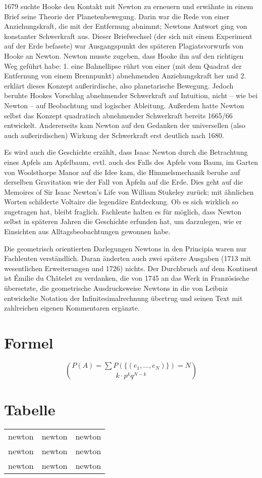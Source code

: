 1679 suchte Hooke den Kontakt mit Newton zu erneuern und erwähnte in einem Brief seine Theorie der Planetenbewegung. Darin war die Rede von einer Anziehungskraft, die mit der Entfernung abnimmt; Newtons Antwort ging von konstanter Schwerkraft aus. Dieser Briefwechsel (der sich mit einem Experiment auf der Erde befasste) war Ausgangspunkt des späteren Plagiatsvorwurfs von Hooke an Newton. Newton musste zugeben, dass Hooke ihn auf den richtigen Weg geführt habe: 1. eine Bahnellipse rührt von einer (mit dem Quadrat der Entfernung von einem Brennpunkt) abnehmenden Anziehungskraft her und 2. erklärt dieses Konzept außerirdische, also planetarische Bewegung. Jedoch beruhte Hookes Vorschlag abnehmender Schwerkraft auf Intuition, nicht – wie bei Newton – auf Beobachtung und logischer Ableitung. Außerdem hatte Newton selbst das Konzept quadratisch abnehmender Schwerkraft bereits 1665/66 entwickelt. Andererseits kam Newton auf den Gedanken der universellen (also auch außerirdischen) Wirkung der Schwerkraft erst deutlich nach 1680.

Es wird auch die Geschichte erzählt, dass Isaac Newton durch die Betrachtung eines Apfels am Apfelbaum, evtl. auch des Falls des Apfels vom Baum, im Garten von Woolsthorpe Manor auf die Idee kam, die Himmelsmechanik beruhe auf derselben Gravitation wie der Fall von Äpfeln auf die Erde. Dies geht auf die Memoires of Sir Isaac Newton’s Life von William Stukeley zurück; mit ähnlichen Worten schilderte Voltaire die legendäre Entdeckung. Ob es sich wirklich so zugetragen hat, bleibt fraglich. Fachleute halten es für möglich, dass Newton selbst in späteren Jahren die Geschichte erfunden hat, um darzulegen, wie er Einsichten aus Alltagsbeobachtungen gewonnen habe.

Die geometrisch orientierten Darlegungen Newtons in den Principia waren nur Fachleuten verständlich. Daran änderten auch zwei spätere Ausgaben (1713 mit wesentlichen Erweiterungen und 1726) nichts. Der Durchbruch auf dem Kontinent ist Émilie du Châtelet zu verdanken, die von 1745 an das Werk in Französische übersetzte, die geometrische Ausdrucksweise Newtons in die von Leibniz entwickelte Notation der Infinitesimalrechnung übertrug und seinen Text mit zahlreichen eigenen Kommentaren ergänzte.





\section{Formel}
$$ P(A) = \sum P(\{ (e_1,...,e_N) \})  =  {N}\choose{k} \cdot p^kq^{N-k}$$




\section{Tabelle}
\begin{center}
\begin{tabular}{ |c|c|c| } 
 \hline
 newton & newton & newton \\ 
 newton & newton & newton \\ 
 newton & newton & newton \\ 
 \hline
\end{tabular}
\end{center}



